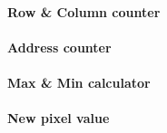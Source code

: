 \paragraph{Row \& Column counter}
\paragraph{Address counter}
\paragraph{Max \& Min calculator}
\paragraph{New pixel value}
